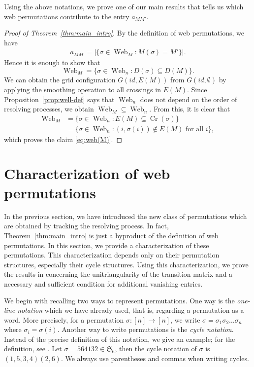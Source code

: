 \documentclass[reqno,12pt]{amsart}
\theoremstyle{definition}
\theoremstyle{remark}
\newcommand\Cr{\operatorname{Cr}}
\newcommand\Web{\operatorname{Web}}
\newcommand\SYM{\mathfrak{S}}
\begin{document}
Using the above notations, we prove one of our main results that tells us which
web permutations contribute to the entry $a_{MM'}$.
\begin{proof}[Proof of Theorem~\ref{thm:main_intro}]
  By the definition of web permutations, we have 
  \begin{align*}
    a_{MM'} = | \{ \sigma\in \Web_M : M(\sigma) = M' \} |.
  \end{align*}
  Hence it is enough to show that
  \begin{equation}\label{eq:web(M)}
    \Web_M = \{ \sigma\in \Web_n : D(\sigma)\subseteq D(M) \}.
  \end{equation}
  We can obtain the grid configuration \( G(id,E(M)) \) from \( G(id,\emptyset) \) by applying the smoothing operation to all crossings in \( E(M) \).
  Since Proposition~\ref{prop:well-def} says that \( \Web_n \) does not depend on the order of resolving processes, we obtain \( \Web_M \subseteq \Web_n \).
  From this, it is clear that
  \begin{align*}
    \Web_M &= \{ \sigma\in \Web_n : E(M)\subseteq \Cr(\sigma)\}  \\
    &= \{ \sigma\in \Web_n : (i,\sigma(i)) \not\in E(M) \mbox{ for all } i \},
  \end{align*}
  which proves the claim \eqref{eq:web(M)}.
\end{proof}

\section{Characterization of web permutations}
\label{sec:characterization}
In the previous section, we have introduced the new class of permutations
which are obtained by tracking the resolving process.
In fact, Theorem~\ref{thm:main_intro} is just a byproduct of the definition of
web permutations.
In this section, we provide a characterization of these permutations.
This characterization depends only on their permutation structures,
especially their cycle structures.
Using this characterization, we prove the results in \cite{RT19,IZ22}
concerning the unitriangularity of the transition matrix and a necessary
and sufficient condition for additional vanishing entries.


We begin with recalling two ways to represent permutations.
One way is the \emph{one-line notation} which we have already used,
that is, regarding a permutation as a word.
More precisely, for a permutation \( \sigma:[n]\rightarrow[n] \),
we write \( \sigma =  \sigma_1 \sigma_2 \dots \sigma_n \)
where \( \sigma_i = \sigma(i) \).
Another way to write permutations is the \emph{cycle notation}.
Instead of the precise definition of this notation, we give an example;
for the definition, see \cite{Sta12}.
Let \( \sigma = 564132\in\SYM_6 \), then the cycle notation of \( \sigma \) is \( (1,5,3,4)(2,6) \).
We always use parentheses and commas when writing cycles.
\end{document}
